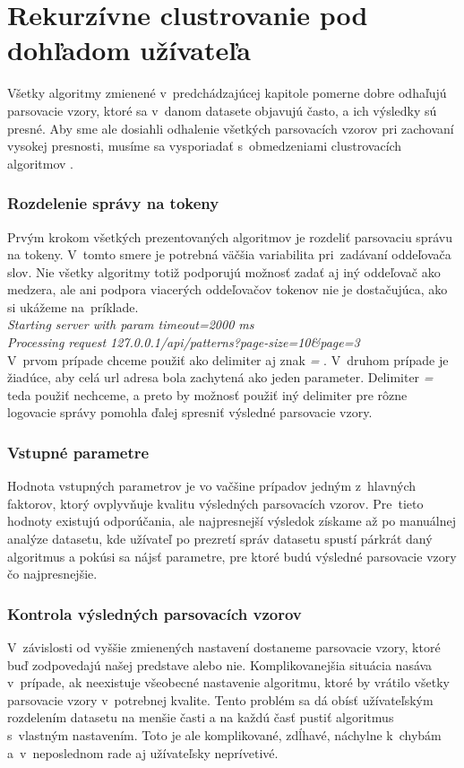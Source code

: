 \chapter{Rekurzívne clustrovanie pod dohľadom užívateľa}

Všetky algoritmy zmienené v~predchádzajúcej kapitole pomerne dobre odhaľujú parsovacie vzory, ktoré sa v~danom datasete objavujú často, a ich výsledky sú presné. Aby sme ale dosiahli odhalenie všetkých parsovacích vzorov pri zachovaní vysokej presnosti, musíme sa vysporiadať s~obmedzeniami clustrovacích algoritmov \parencite{Tovarnak2017}.

\subsection*{Rozdelenie správy na tokeny}
Prvým krokom všetkých prezentovaných algoritmov je rozdeliť parsovaciu správu na tokeny. V~tomto smere je potrebná väčšia variabilita pri~zadávaní oddeľovača slov. Nie všetky algoritmy totiž podporujú možnosť zadať aj iný oddeľovač ako medzera, ale ani podpora via\-cerých oddeľovačov tokenov nie je dostačujúca, ako si ukážeme na~príklade. \\

\indent \emph{Starting server with param timeout=2000 ms} \\
\indent \emph{Processing request 127.0.0.1/api/patterns?page-size=10\&page=3} \\

V~prvom prípade chceme použiť ako delimiter aj znak \emph{=} . V~druhom prípade je žiadúce, aby celá url adresa bola zachytená ako jeden para\-meter. Delimiter \emph{=} teda použiť nechceme, a preto by možnosť použiť iný delimiter pre rôzne logovacie správy pomohla ďalej spresniť výsledné parsovacie vzory.

\subsection*{Vstupné parametre}
Hodnota vstupných parametrov je vo vačšine prípadov jedným z~hlav\-ných faktorov, ktorý ovplyvňuje kvalitu výsledných parsovacích vzorov.
Pre~tieto hodnoty existujú odporúčania, ale najpresnejší výsledok získame až po manuálnej analýze datasetu, kde užívateľ po prezre\-tí správ datasetu spustí párkrát daný algoritmus a pokúsi sa nájsť parametre, pre ktoré budú výsledné parsovacie vzory čo najpresnej\-šie.

\subsection*{Kontrola výsledných parsovacích vzorov}
V~závislosti od vyššie zmienených nastavení dostaneme parsovacie vzory, ktoré buď zodpovedajú našej predstave alebo nie. Komplikovanejšia situácia nasáva v~prípade, ak neexistuje všeobecné nastavenie algoritmu, ktoré by vrátilo všetky parsovacie vzory v~potrebnej kvalite. Tento problém sa dá obísť užívateľským rozdelením datasetu na menšie časti a na každú časť pustiť algoritmus s~vlastným nastavením. Toto je ale komplikované, zdĺhavé, náchylne k~chybám a~v~ne\-poslednom rade aj užívateľsky neprívetivé.

